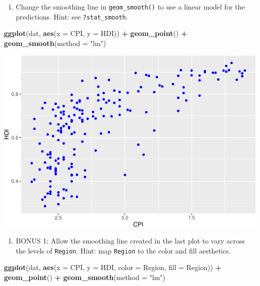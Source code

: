 \documentclass[
]{book}
\newenvironment{Shaded}{\begin{snugshade}}{\end{snugshade}}
\newcommand{\DataTypeTok}[1]{\textcolor[rgb]{0.13,0.29,0.53}{#1}}
\newcommand{\KeywordTok}[1]{\textcolor[rgb]{0.13,0.29,0.53}{\textbf{#1}}}
\newcommand{\NormalTok}[1]{#1}
\newcommand{\OperatorTok}[1]{\textcolor[rgb]{0.81,0.36,0.00}{\textbf{#1}}}
\newcommand{\StringTok}[1]{\textcolor[rgb]{0.31,0.60,0.02}{#1}}
\providecommand{\tightlist}{%
  \setlength{\itemsep}{0pt}\setlength{\parskip}{0pt}}
\begin{document}
\begin{alert}
\begin{enumerate}
\def\labelenumi{\arabic{enumi}.}
\setcounter{enumi}{3}
\tightlist
\item
  Change the smoothing line in \texttt{geom\_smooth()} to use a linear model for the predictions. Hint: see \texttt{?stat\_smooth}.
\end{enumerate}

\begin{Shaded}
\begin{Highlighting}[]
\KeywordTok{ggplot}\NormalTok{(dat, }\KeywordTok{aes}\NormalTok{(}\DataTypeTok{x =}\NormalTok{ CPI, }\DataTypeTok{y =}\NormalTok{ HDI)) }\OperatorTok{+}
\StringTok{  }\KeywordTok{geom\_point}\NormalTok{() }\OperatorTok{+}
\StringTok{  }\KeywordTok{geom\_smooth}\NormalTok{(}\DataTypeTok{method =} \StringTok{"lm"}\NormalTok{)}
\end{Highlighting}
\end{Shaded}

\includegraphics{R/Rgraphics/figures/unnamed-chunk-195-1.pdf}

\begin{enumerate}
\def\labelenumi{\arabic{enumi}.}
\setcounter{enumi}{4}
\tightlist
\item
  BONUS 1: Allow the smoothing line created in the last plot to vary across the levels of \texttt{Region}. Hint: map \texttt{Region} to the color and fill aesthetics.
\end{enumerate}

\begin{Shaded}
\begin{Highlighting}[]
\KeywordTok{ggplot}\NormalTok{(dat, }\KeywordTok{aes}\NormalTok{(}\DataTypeTok{x =}\NormalTok{ CPI, }\DataTypeTok{y =}\NormalTok{ HDI, }\DataTypeTok{color =}\NormalTok{ Region, }\DataTypeTok{fill =}\NormalTok{ Region)) }\OperatorTok{+}
\StringTok{  }\KeywordTok{geom\_point}\NormalTok{() }\OperatorTok{+}
\StringTok{  }\KeywordTok{geom\_smooth}\NormalTok{(}\DataTypeTok{method =} \StringTok{"lm"}\NormalTok{)}
\end{Highlighting}
\end{Shaded}


\end{alert}
\end{document}

